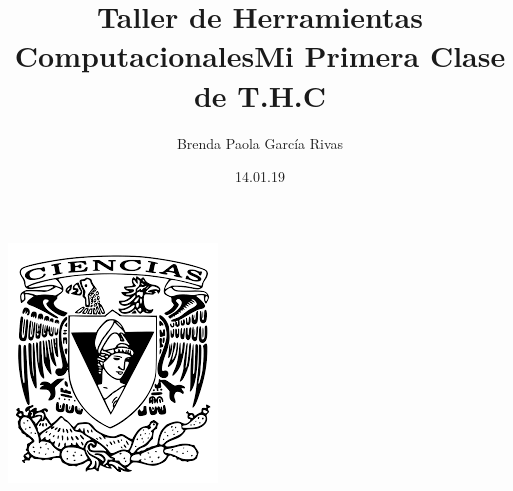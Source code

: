 \documentclass[letterpaper, 12pt, oneside]{article}
\title{\huge \color{red} Taller de Herramientas Computacionales}
\author{Brenda Paola García Rivas}
\date{14.01.19}
\begin{document}
	\maketitle
	\begin{center}
		\includegraphics[scale=0.90]{1.png}
	\end{center}
	\newpage
	\title{\Huge Mi Primera Clase de T.H.C\\}
	
\end{document}
